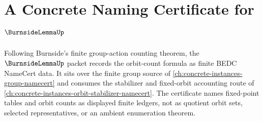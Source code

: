 \chapter{A Concrete Naming Certificate for $\BurnsideLemmaUp$}
\label{ch:concrete-instances-burnside-lemma-namecert}

Following Burnside's finite group-action counting theorem, the $\BurnsideLemmaUp$ packet records the orbit-count formula as finite BEDC NameCert data. It sits over the finite group source of \autoref{ch:concrete-instances-group-namecert} and consumes the stabilizer and fixed-orbit accounting route of \autoref{ch:concrete-instances-orbit-stabilizer-namecert}. The certificate names fixed-point tables and orbit counts as displayed finite ledgers, not as quotient orbit sets, selected representatives, or an ambient enumeration theorem.

